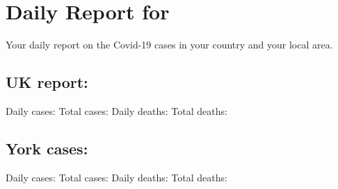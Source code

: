 \documentclass{article}
\begin{document}
\section*{Daily Report for \@date}
Your daily report on the Covid-19 cases in your country and your local area.
\subsection*{UK report:}
Daily cases: 
Total cases:%
Daily deaths:%
Total deaths:%

\subsection*{York cases:}
Daily cases:%
Total cases:%
Daily deaths:%
Total deaths:%
\end{document}

